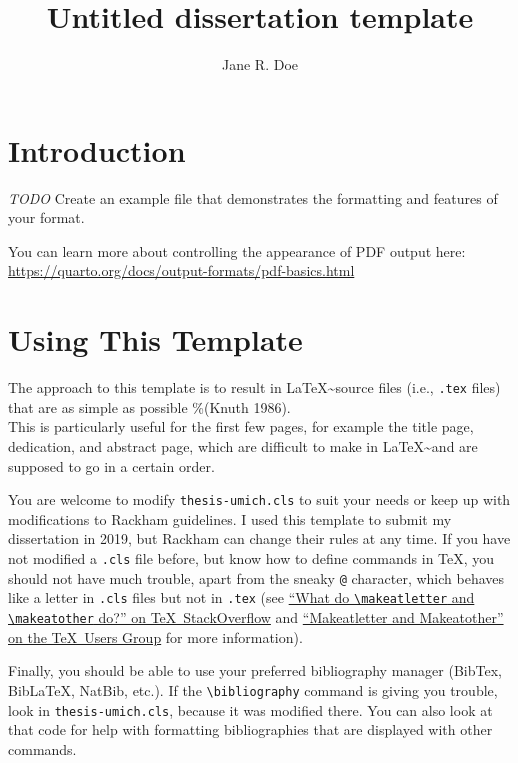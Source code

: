 \documentclass[letterpaper,
thesis]{rackham}
\title{Untitled dissertation template}
\author{Jane R. Doe}
\begin{document}

\hypertarget{introduction}{%
\chapter{Introduction}\label{introduction}}

\emph{TODO} Create an example file that demonstrates the formatting and
features of your format.

You can learn more about controlling the appearance of PDF output here:
\url{https://quarto.org/docs/output-formats/pdf-basics.html}


\hypertarget{using-this-template}{%
\chapter{Using This Template}\label{using-this-template}}

The approach to this template is to result in
\LaTeX\textasciitilde source files (i.e., \texttt{.tex} files) that are
as simple as possible \%(Knuth 1986).\\
This is particularly useful for the first few pages, for example the
title page, dedication, and abstract page, which are difficult to make
in \LaTeX\textasciitilde and are supposed to go in a certain order.

You are welcome to modify \texttt{thesis-umich.cls} to suit your needs
or keep up with modifications to Rackham guidelines. I used this
template to submit my dissertation in 2019, but Rackham can change their
rules at any time. If you have not modified a \texttt{.cls} file before,
but know how to define commands in \TeX, you should not have much
trouble, apart from the sneaky \verb=@= character, which behaves like a
letter in \texttt{.cls} files but not in \texttt{.tex} (see
\href{https://tex.stackexchange.com/q/8351/21027}{``What do
  \texttt{\textbackslash makeatletter} and \texttt{\textbackslash makeatother}
do?'' on \TeX\ StackOverflow} and
\href{https://tug.org/pipermail/tugindia/2002-January/000178.html}{``Makeatletter
and Makeatother'' on the \TeX\ Users Group} for more information).

Finally, you should be able to use your preferred bibliography manager
(BibTex, BibLaTeX, NatBib, etc.). If the
\texttt{\textbackslash bibliography} command is giving you trouble, look
in \texttt{thesis-umich.cls}, because it was modified there. You can
also look at that code for help with formatting bibliographies that are
displayed with other commands.
\end{document}
